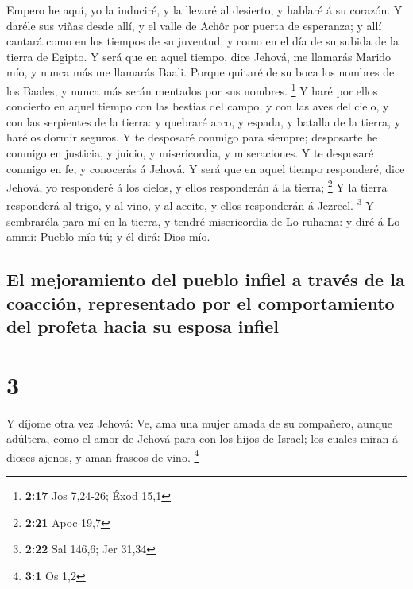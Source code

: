  Empero he aquí, yo la induciré, y la llevaré al
desierto, y hablaré á su corazón.  Y daréle sus viñas
desde allí, y el valle de Achôr por puerta de esperanza; y allí cantará
como en los tiempos de su juventud, y como en el día de su subida de la
tierra de Egipto.  Y será que en aquel tiempo, dice
Jehová, me llamarás Marido mío, y nunca más me llamarás Baali.
 Porque quitaré de su boca los nombres de los Baales, y
nunca más serán mentados por sus nombres. \footnote{\textbf{2:17} Jos
  7,24-26; Éxod 15,1}  Y haré por ellos concierto en
aquel tiempo con las bestias del campo, y con las aves del cielo, y con
las serpientes de la tierra: y quebraré arco, y espada, y batalla de la
tierra, y harélos dormir seguros.  Y te desposaré conmigo
para siempre; desposarte he conmigo en justicia, y juicio, y
misericordia, y miseraciones.  Y te desposaré conmigo en
fe, y conocerás á Jehová.  Y será que en aquel tiempo
responderé, dice Jehová, yo responderé á los cielos, y ellos responderán
á la tierra; \footnote{\textbf{2:21} Apoc 19,7}  Y la
tierra responderá al trigo, y al vino, y al aceite, y ellos responderán
á Jezreel. \footnote{\textbf{2:22} Sal 146,6; Jer 31,34} 
Y sembraréla para mí en la tierra, y tendré misericordia de Lo-ruhama: y
diré á Lo-ammi: Pueblo mío tú; y él dirá: Dios mío.

\hypertarget{el-mejoramiento-del-pueblo-infiel-a-travuxe9s-de-la-coacciuxf3n-representado-por-el-comportamiento-del-profeta-hacia-su-esposa-infiel}{%
\subsection{El mejoramiento del pueblo infiel a través de la coacción,
representado por el comportamiento del profeta hacia su esposa
infiel}\label{el-mejoramiento-del-pueblo-infiel-a-travuxe9s-de-la-coacciuxf3n-representado-por-el-comportamiento-del-profeta-hacia-su-esposa-infiel}}

\hypertarget{section-2}{%
\section{3}\label{section-2}}

 Y díjome otra vez Jehová: Ve, ama una mujer amada de su
compañero, aunque adúltera, como el amor de Jehová para con los hijos de
Israel; los cuales miran á dioses ajenos, y aman frascos de vino.
\footnote{\textbf{3:1} Os 1,2}

